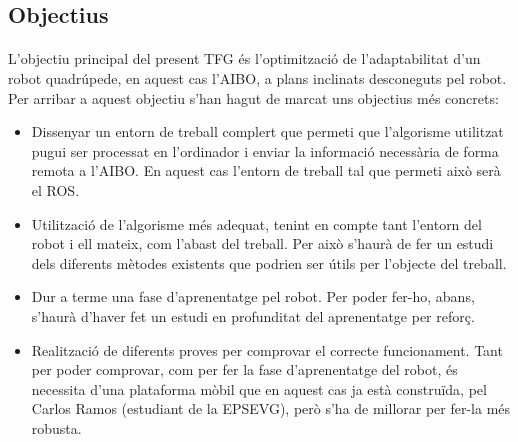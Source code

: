 \documentclass[12pt,a4paper,final,twoside]{article}
\begin{document}
\paragraph{}
 




\subsection*{Objectius}

\paragraph{}L'objectiu principal del present TFG és l'optimització de l'adaptabilitat d'un robot quadrúpede, en aquest cas l'AIBO, a plans inclinats desconeguts pel robot. Per arribar a aquest objectiu s'han hagut de marcat uns objectius més concrets:
\begin{itemize}
\item Dissenyar un entorn de treball complert que permeti que l'algorisme utilitzat pugui ser processat en l'ordinador i enviar la informació necessària de forma remota a l'AIBO. En aquest cas l'entorn de treball tal que permeti això serà el ROS.
\item Utilització de l'algorisme més adequat, tenint en compte tant l'entorn del robot i ell mateix, com l'abast del treball. Per això s'haurà de fer un estudi dels diferents mètodes existents que podrien ser útils per l'objecte del treball.
\item Dur a terme una fase d'aprenentatge pel robot. Per poder fer-ho, abans, s'haurà d'haver fet un estudi en profunditat del aprenentatge per reforç.
\item Realització de diferents proves per comprovar el correcte funcionament. Tant per poder comprovar, com per fer la fase d'aprenentatge del robot, és necessita d'una plataforma mòbil que en aquest cas ja està construïda, pel Carlos Ramos (estudiant de la EPSEVG)\cite{TFG_Carlos_Ramos}, però s'ha de millorar per fer-la més robusta.
\end{itemize}
\end{document}
